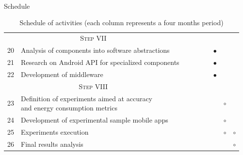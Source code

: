 \documentclass[10pt,xcolor={dvipsnames}]{beamer}
\newcommand{\markonprogress}{\textcolor{colorAzulBienBonito}{$\bullet$}}
\newcommand{\markoff}{\textcolor{PineGreen}{$\circ$}}
\begin{document}
\begin{frame}{Schedule}
\begin{table}[]
{\begin{tabular}{clccccccc}
\multicolumn{2}{c}{\textsc{Step VII}}                                               &  &  &  &  &  &  & \\
20  & Analysis of components into software abstractions                             &  &  &  &  & \markonprogress  &  & \\
21  & Research on Android API for specialized components                            &  &  &  &  & \markonprogress  &  & \\
22  & Development of middleware                                                     &  &  &  &  & \markonprogress  &  & \vspace{1em}\\

\multicolumn{2}{c}{\textsc{Step VIII}}                                              &  &  &  &  &  &  & \\
23  & \makecell[l]{Definition of experiments aimed at accuracy\\and energy consumption metrics}    &  &  &  &  &  & \markoff & \\
24  & Development of experimental sample mobile apps                                &  &  &  &  &  & \markoff & \\
25  & Experiments execution                                                         &  &  &  &  &  & \markoff & \markoff  \\
26  & Final results analysis                                                              &  &  &  &  &  &  & \markoff \\
\bottomrule
\end{tabular}%
}
\caption{Schedule of activities (each column represents a four months period)}
\label{tbl:schedule-part-two}
\end{table}
\end{frame}
\end{document}
